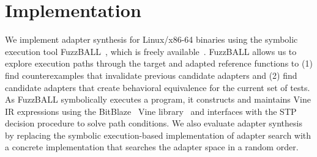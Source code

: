 \section{Implementation}\label{sec:implementation}

We implement adapter synthesis for Linux/x86-64 binaries using
the symbolic execution tool FuzzBALL~\cite{fuzzball}, which is freely available~\cite{fuzzball-github}.
FuzzBALL allows us to explore execution paths through the target and
adapted reference functions to (1) find counterexamples that invalidate previous candidate adapters and (2) find candidate adapters that create behavioral equivalence for the current set of tests. 
%
As FuzzBALL symbolically executes a program, it constructs and maintains Vine IR expressions using the BitBlaze~\cite{bitblaze-url} Vine library~\cite{bitblaze-vine} and interfaces with the STP~\cite{stp} decision procedure to solve path conditions.
%
We also evaluate adapter synthesis by replacing the symbolic execution-based implementation of adapter search with a concrete implementation that searches the adapter space in a random order.
%
